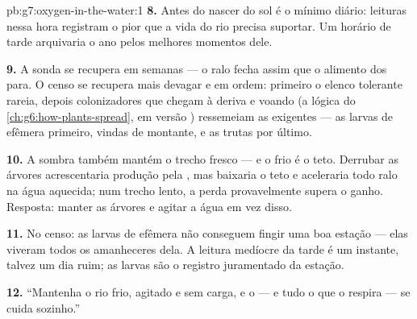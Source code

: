 \begin{solution}{pb:g7:oxygen-in-the-water:1}
\textbf{8.} Antes do nascer do sol é o mínimo diário: leituras nessa
hora registram o pior que a vida do rio precisa suportar. Um horário
de tarde arquivaria o ano pelos melhores momentos dele.

\textbf{9.} A sonda se recupera em semanas --- o ralo fecha assim que o
alimento dos  para. O censo se recupera mais devagar e
em ordem: primeiro o elenco tolerante rareia, depois colonizadores que
chegam à deriva e voando (a lógica do
\cref{ch:g6:how-plants-spread}, em versão ) ressemeiam as
 exigentes --- as larvas de efêmera primeiro, vindas de
montante, e as trutas por último.

\textbf{10.} A sombra também mantém o trecho fresco --- e o frio é o
teto. Derrubar as árvores acrescentaria produção pela , mas
baixaria o teto e aceleraria todo ralo na água aquecida; num trecho
lento, a perda provavelmente supera o ganho. Resposta: manter as
árvores e agitar a água em vez disso.

\textbf{11.} No censo: as larvas de efêmera não conseguem fingir uma
boa estação --- elas viveram todos os amanheceres dela. A leitura
medíocre da tarde é um instante, talvez um dia ruim; as larvas são o
registro juramentado da estação.

\textbf{12.} ``Mantenha o rio frio, agitado e sem carga, e o 
--- e tudo o que o respira --- se cuida sozinho.''
\end{solution}
